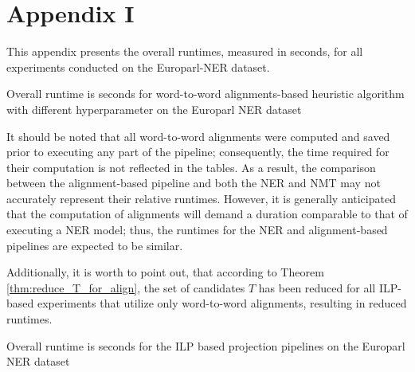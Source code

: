 \chapter{Appendix I}
\label{sec:appendix}

This appendix presents the overall runtimes, measured in seconds, for all experiments conducted on the Europarl-NER dataset.

\begin{table}[ht]
  \centering
  
  \caption{Overall runtime is seconds for word-to-word alignments-based heuristic
  algorithm with different hyperparameter  on the Europarl NER dataset}
  \label{tab:europarl_heur_runtime}
\end{table}

It should be noted that all word-to-word alignments were computed
and saved prior to executing any part of the pipeline; consequently,
the time required for their computation is not reflected in the
tables. As a result, the comparison between the alignment-based pipeline
and both the NER and NMT may not accurately represent their
relative runtimes. However, it is generally anticipated that
the computation of alignments will demand a duration comparable
to that of executing a NER model; thus, the runtimes for the
NER and alignment-based pipelines are expected to be similar.

Additionally, it is worth to point out, that according to Theorem \ref{thm:reduce_T_for_align},
the set of candidates \( T \) has been reduced for all ILP-based experiments that
utilize only word-to-word alignments, resulting in reduced runtimes.

\begin{table}[t]
  \centering
  
  \caption{Overall runtime is seconds for the ILP based projection pipelines
  on the Europarl NER dataset}
  \label{tab:europarl_ilp_runtime}
\end{table}
